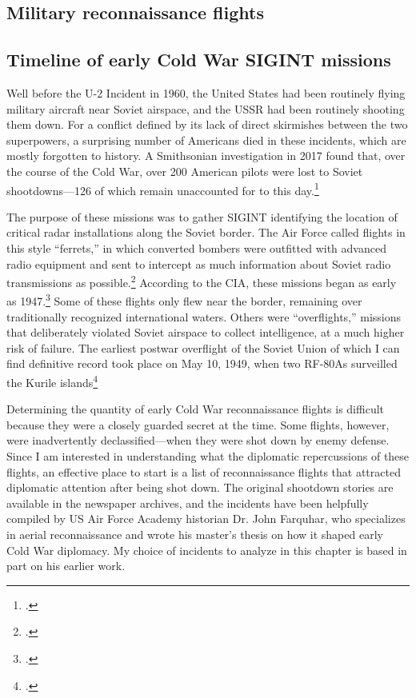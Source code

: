 \documentclass{report}
\begin{document}
\begin{refsegment}
\section{Military reconnaissance flights}
\subsection{Timeline of early Cold War SIGINT missions}
Well before the U-2 Incident in 1960, the United States had been routinely flying military aircraft near Soviet airspace, and the USSR had been routinely shooting them down. For a conflict defined by its lack of direct skirmishes between the two superpowers, a surprising number of Americans died in these incidents, which are mostly forgotten to history. A Smithsonian investigation in 2017 found that, over the course of the Cold War, over 200 American pilots were lost to Soviet shootdowns---126 of which remain unaccounted for to this day.\footcite{glenshaw_secret_2017}

The purpose of these missions was to gather SIGINT identifying the location of critical radar installations along the Soviet border. The Air Force called flights in this style ``ferrets,'' in which converted bombers were outfitted with advanced radio equipment and sent to intercept as much information about Soviet radio transmissions as possible.\footcite[p.~4]{peterson_maybe_1993} According to the CIA, these missions began as early as 1947.\footcite[p.~4]{peterson_maybe_1993} Some of these flights only flew near the border, remaining over traditionally recognized international waters. Others were ``overflights,'' missions that deliberately violated Soviet airspace to collect intelligence, at a much higher risk of failure. The earliest postwar overflight of the Soviet Union of which I can find definitive record took place on May 10, 1949, when two RF-80As surveilled the Kurile islands\footcite[p.~8]{peebles_shadow_2000}

Determining the quantity of early Cold War reconnaissance flights is difficult because they were a closely guarded secret at the time. Some flights, however, were inadvertently declassified---when they were shot down by enemy defense. Since I am interested in understanding what the diplomatic repercussions of these flights, an effective place to start is a list of reconnaissance flights that attracted diplomatic attention after being shot down. The original shootdown stories are available in the newspaper archives, and the incidents have been helpfully compiled by US Air Force Academy historian Dr. John Farquhar, who specializes in aerial reconnaissance and wrote his master's thesis on how it shaped early Cold War diplomacy. My choice of incidents to analyze in this chapter is based in part on his earlier work.


\end{refsegment}
\end{document}
